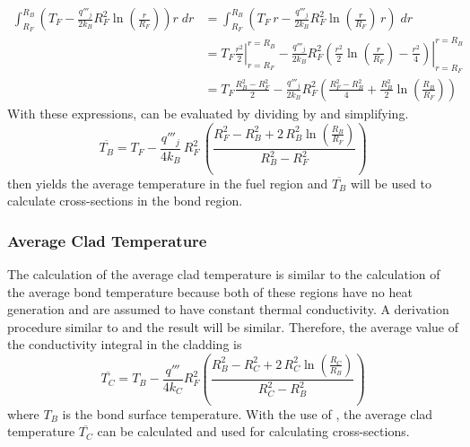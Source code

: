       \begin{align}
        \int_{R_F}^{R_B} \left( T_F - \frac{q'''_j}{2 k_B} R_F^2
          \ln\left(\frac{r}{R_F}\right) \right) r \; dr 
          &= \int_{R_F}^{R_B}
          \left( T_F \, r - \frac{q'''_j}{2 k_B}R_F^2
          \ln\left(\frac{r}{R_F}\right) \, r \right) \; dr \\
        &=
          \left. T_F \frac{r^2}{2} \right|_{r=R_F}^{r=R_B} - 
          \left. \frac{q'''_j}{2 k_B}R_F^2 \left( \frac{r^2}{2}
          \ln\left(\frac{r}{R_F}\right) - \frac{r^2}{4} \right)
          \right|_{r=R_F}^{r=R_B} \\
        \label{eq:tbbar_numerator}
        &= 
          T_F \frac{R_B^2-R_F^2}{2} - \frac{q'''_j}{2 k_B} R_F^2
          \left( \frac{R_F^2 - R_B^2}{4} + \frac{R_B^2}{2}
          \ln\left(\frac{R_B}{R_F}\right) \right)
      \end{align}
      With these expressions,  can be evaluated by 
      dividing  by  and 
      simplifying.
      \begin{equation}
        \label{eq:tb_bar}
        \overline{T_B} = T_F - \frac{q'''_j}{4 k_B} \, R_F^2 \, \left(
          \frac{R_F^2 - R_B^2 + 2\,R_B^2 \ln\left(\frac{R_B}{R_F}\right)}
          {R_B^2-R_F^2}\right)
      \end{equation}
       then yields the average temperature in the fuel region
      and $\overline{T_B}$ will be used to calculate cross-sections in the bond
      region.

    \subsubsection{Average Clad Temperature}
      The calculation of the average clad temperature is similar to the
      calculation of the average bond temperature because both of these regions
      have no heat generation and are assumed to have constant thermal
      conductivity. A derivation procedure similar to
       and the result will be similar. Therefore,
      the average value of the conductivity integral in the cladding is 
      \begin{equation}
        \label{eq:tc_bar}
        \overline{T_C} = T_B - \frac{q'''}{4 k_C} R_F^2 \left(
          \frac{R_B^2 - R_C^2 + 2 \, R_C^2 \ln\left(\frac{R_C}{R_B}\right)}
          {R_C^2 - R_B^2} \right)
      \end{equation}
      where $T_B$ is the bond surface temperature. With the use of
      , the average clad temperature $\overline{T_C}$ can be
      calculated and used for calculating cross-sections.

